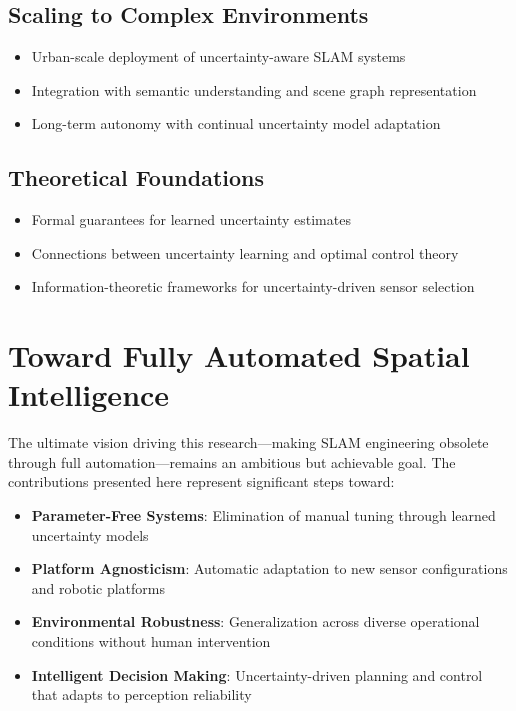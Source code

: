 \subsection{Scaling to Complex Environments}
\begin{itemize}
    \item Urban-scale deployment of uncertainty-aware SLAM systems
    \item Integration with semantic understanding and scene graph representation
    \item Long-term autonomy with continual uncertainty model adaptation
\end{itemize}

\subsection{Theoretical Foundations}
\begin{itemize}
    \item Formal guarantees for learned uncertainty estimates
    \item Connections between uncertainty learning and optimal control theory
    \item Information-theoretic frameworks for uncertainty-driven sensor selection
\end{itemize}

\section{Toward Fully Automated Spatial Intelligence}

The ultimate vision driving this research—making SLAM engineering obsolete through full automation—remains an ambitious but achievable goal. The contributions presented here represent significant steps toward:

\begin{itemize}
    \item \textbf{Parameter-Free Systems}: Elimination of manual tuning through learned uncertainty models
    \item \textbf{Platform Agnosticism}: Automatic adaptation to new sensor configurations and robotic platforms
    \item \textbf{Environmental Robustness}: Generalization across diverse operational conditions without human intervention
    \item \textbf{Intelligent Decision Making}: Uncertainty-driven planning and control that adapts to perception reliability
\end{itemize}

